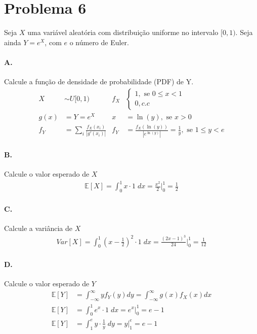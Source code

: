\documentclass{article}
\begin{document}
\section*{Problema 6}
Seja $X$ uma variável aleatória com distribuição uniforme no intervalo $[0,1)$. Seja ainda $Y =
e^X$, com $e$ o número de Euler.

\paragraph*{A.} Calcule a função de densidade de probabilidade (PDF) de Y.
\begin{align*}
    X &\sim U[0,1) & f_X
      &\begin{cases}
        1, \text{ se } 0 \le x < 1 \\
        0, c.c
    \end{cases} \\
    g(x) &= Y = e^X & x &= \ln(y), \text{ se } x > 0 \\
    f_Y &= \sum_i \frac{f_X(x_i)}{|g'(x_i)|} & f_Y &= \frac{f_X(\ln(y))}{|e^{\ln(y)}|} =
    \frac{1}{y}, \text{ se } 1 \le y < e
\end{align*}

\paragraph*{B.} Calcule o valor esperado de $X$
\begin{align*}
    \mathbb{E}[X] = \int_0^1 x \cdot 1 \; dx = \frac{x^2}{2} \bigg\rvert_{0}^{1} = \frac{1}{2}
\end{align*}

\paragraph*{C.} Calcule a variância de $X$
\begin{align*}
    Var[X] = \int_0^1 (x- \frac{1}{2})^2 \cdot 1 \; dx = \frac{(2x -1)^3}{24} \bigg\rvert_{0}^{1} =
    \frac{1}{12}
\end{align*}

\paragraph*{D.} Calcule o valor esperado de $Y$
\begin{align*}
    \mathbb{E}[Y] &= \int_{-\infty}^{\infty} y f_Y(y)dy = \int_{-\infty}^{\infty} g(x)f_X(x)dx \\
    \mathbb{E}[Y] &= \int_0^1 e^x \cdot 1 \; dx = e^x \big\rvert_{0}^{1} = e-1 \\
    \mathbb{E}[Y] &= \int_1^e y \cdot \frac{1}{y} \; dy = y \big\rvert_{1}^{e} = e-1 \\
\end{align*}
\end{document}
